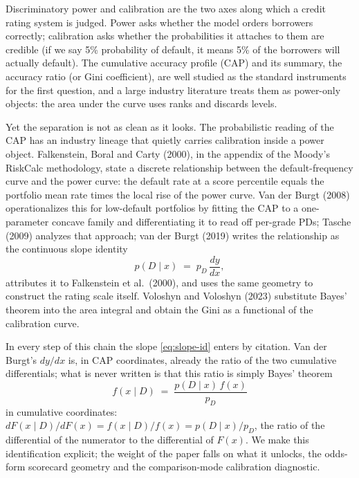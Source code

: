 \documentclass[12pt]{article}
\newcommand{\pD}{p_D}
\newcommand{\PDx}{p(D \mid x)}
\begin{document}
Discriminatory power and calibration are the two axes along which a credit rating system is
judged. Power asks whether the model orders borrowers correctly; calibration asks whether
the probabilities it attaches to them are credible (if we say 5\% probability of default,
it means 5\% of the borrowers will actually default). The cumulative accuracy profile (CAP) and
its summary, the accuracy ratio (or Gini coefficient), are well studied as the standard instruments for
the first question, and a large industry literature treats them as power-only objects: the area
under the curve uses ranks and discards levels.

Yet the separation is not as clean as it looks. The probabilistic reading of the CAP has an
industry lineage that quietly carries calibration inside a power object. Falkenstein, Boral
and Carty (2000), in the appendix of the Moody's RiskCalc methodology, state a discrete
relationship between the default-frequency curve and the power curve: the default rate at a
score percentile equals the portfolio mean rate times the local rise of the power curve.
Van der Burgt (2008) operationalizes this for low-default portfolios by fitting the CAP to a
one-parameter concave family and differentiating it to read off per-grade PDs; Tasche (2009)
analyzes that approach; van der Burgt (2019) writes the relationship as the continuous slope
identity
\begin{equation}\label{eq:slope-id}
\PDx \;=\; \pD\,\frac{dy}{dx},
\end{equation}
attributes it to Falkenstein et al.\ (2000), and uses the same geometry to construct the
rating scale itself. Voloshyn and Voloshyn (2023) substitute Bayes' theorem into the area
integral and obtain the Gini as a functional of the calibration curve.

In every step of this chain the slope \eqref{eq:slope-id} enters by citation. Van der Burgt's
$dy/dx$ is, in CAP coordinates, already the ratio of the two cumulative differentials; what is
never written is that this ratio is simply Bayes' theorem
\begin{equation}\label{eq:bayes-intro}
f(x\mid D)\;=\;\frac{\PDx\,f(x)}{\pD}
\end{equation}
in cumulative coordinates: $dF(x\mid D)/dF(x) = f(x\mid D)/f(x) = \PDx/\pD$, the ratio of the
differential of the numerator to the differential of $F(x)$. We make this identification
explicit; the weight of the paper falls on what it unlocks, the odds-form scorecard geometry and
the comparison-mode calibration diagnostic.
\end{document}
